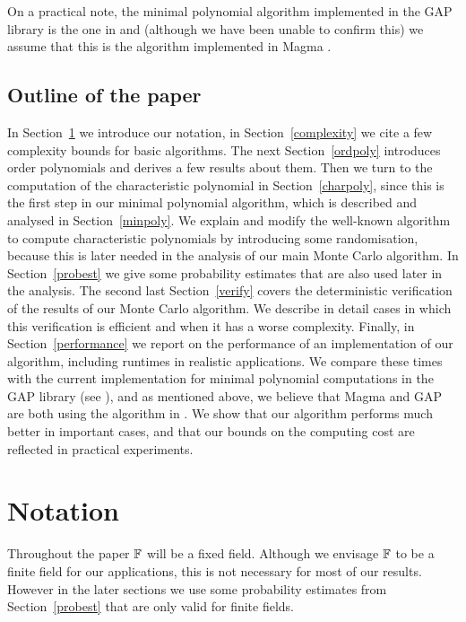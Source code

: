 On a practical note,  the minimal polynomial algorithm implemented in the GAP library
is the one in \cite{Steel} and (although we have been unable to 
confirm this) we assume that this is the algorithm implemented 
in Magma \cite{Magma}. 

\subsection{Outline of the paper}
In Section~\ref{notation} we introduce our notation, in
Section~\ref{complexity} we cite a few complexity bounds for basic
algorithms. The next Section~\ref{ordpoly} introduces order polynomials
and derives a few results about them. Then we turn to the computation
of the characteristic polynomial in Section~\ref{charpoly}, since this
is the first step in our minimal polynomial algorithm, which is described
and analysed in Section~\ref{minpoly}. We explain and modify the 
well-known algorithm to compute characteristic polynomials by introducing
some randomisation, because this is later needed in the analysis of our
main Monte Carlo algorithm. In Section~\ref{probest} we give some
probability estimates that are also used later in the analysis.
The second last Section~\ref{verify}
covers the deterministic verification of the results of our
Monte Carlo algorithm. We describe in detail cases in which this
verification is efficient and when it has a worse complexity.
Finally, in Section~\ref{performance} we report on the performance
of an implementation of our algorithm, including runtimes in 
realistic applications.  We compare these
times with the current implementation for minimal polynomial computations
in the {\sf GAP} library (see \cite{GAP4}), and as mentioned above, we 
believe that Magma and {\sf GAP} are both using the algorithm in 
\cite{Steel}. We show that our algorithm performs
much better in important cases, and that our bounds on the computing
cost are reflected in practical experiments.



\section{Notation}
\label{notation}

Throughout the paper $\mathbb{F}$ will be a fixed field. Although we envisage
$\mathbb{F}$ to be a finite field for our applications, this is not necessary
for most of our results. However in the later sections we use some probability 
estimates from Section~\ref{probest} that are only valid for 
finite fields.

